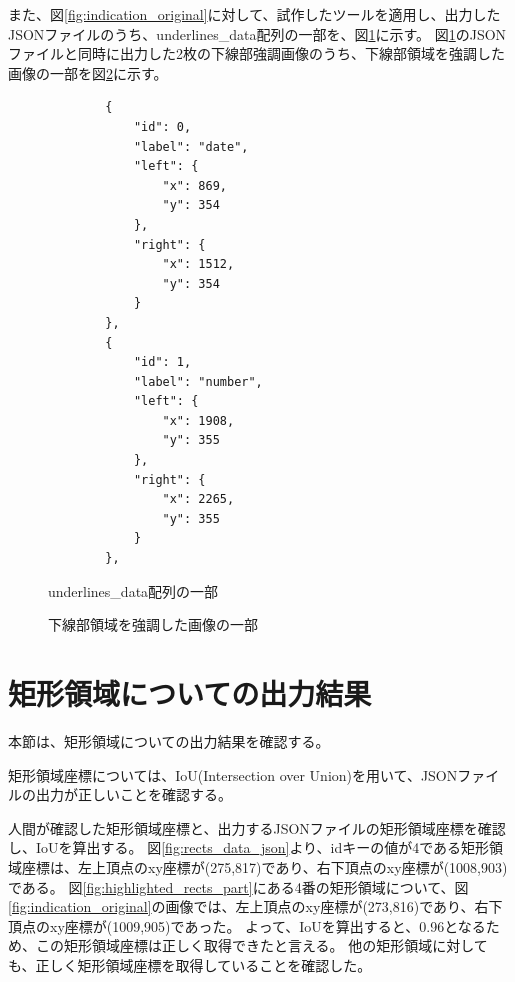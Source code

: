 また、図\ref{fig:indication_original}に対して、試作したツールを適用し、出力したJSONファイルのうち、underlines\_data配列の一部を、図\ref{fig:underlines_data_json}に示す。
図\ref{fig:underlines_data_json}のJSONファイルと同時に出力した2枚の下線部強調画像のうち、下線部領域を強調した画像の一部を図\ref{fig:highlighted_underlines_part}に示す。

\lstset{language=}
\begin{figure}[t]
    \begin{lstlisting}
        {
            "id": 0,
            "label": "date",
            "left": {
                "x": 869,
                "y": 354
            },
            "right": {
                "x": 1512,
                "y": 354
            }
        },
        {
            "id": 1,
            "label": "number",
            "left": {
                "x": 1908,
                "y": 355
            },
            "right": {
                "x": 2265,
                "y": 355
            }
        },
    \end{lstlisting}
    \caption{underlines\_data配列の一部}\label{fig:underlines_data_json}
\end{figure}

\begin{figure}[t]
    \begin{center}
        \caption{下線部領域を強調した画像の一部}
        \label{fig:highlighted_underlines_part}
    \end{center}
\end{figure}

\section{矩形領域についての出力結果}\label{sec:result_rect}
本節は、矩形領域についての出力結果を確認する。

矩形領域座標については、IoU(Intersection over Union)を用いて、JSONファイルの出力が正しいことを確認する。

人間が確認した矩形領域座標と、出力するJSONファイルの矩形領域座標を確認し、IoUを算出する。
図\ref{fig:rects_data_json}より、idキーの値が4である矩形領域座標は、左上頂点のxy座標が(275,817)であり、右下頂点のxy座標が(1008,903)である。
図\ref{fig:highlighted_rects_part}にある4番の矩形領域について、図\ref{fig:indication_original}の画像では、左上頂点のxy座標が(273,816)であり、右下頂点のxy座標が(1009,905)であった。
よって、IoUを算出すると、0.96となるため、この矩形領域座標は正しく取得できたと言える。
他の矩形領域に対しても、正しく矩形領域座標を取得していることを確認した。


